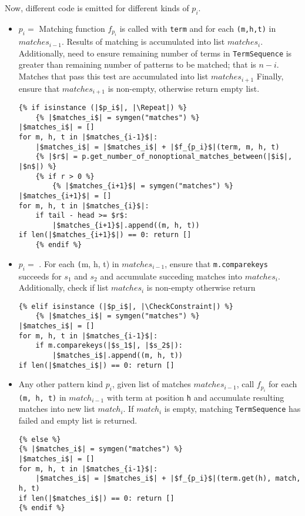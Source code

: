 Now, different code is emitted for different kinds of $p_i$. 

\begin{itemize}
\item $p_i=$ \Repeat Matching function $f_{p_i}$ is called with \texttt{term} and for each \texttt{(m,h,t)} in $matches_{i-1}$. Results of matching is accumulated into list $matches_{i}$. Additionally, need to ensure remaining number of terms in \texttt{TermSequence} is greater than remaining number of patterns to be matched; that is $n-i$. Matches that pass this test are accumulated into list $matches_{i+1}$ Finally, ensure that $matches_{i+1}$ is non-empty, otherwise return empty list.
\begin{verbatim}
{% if isinstance (|$p_i$|, |\Repeat|) %}
	{% |$matches_i$| = symgen("matches") %}
|$matches_i$| = []
for m, h, t in |$matches_{i-1}$|:
	|$matches_i$| = |$matches_i$| + |$f_{p_i}$|(term, m, h, t)
	{% |$r$| = p.get_number_of_nonoptional_matches_between(|$i$|, |$n$|) %}
	{% if r > 0 %}
		{% |$matches_{i+1}$| = symgen("matches") %}
|$matches_{i+1}$| = []
for m, h, t in |$matches_{i}$|:
	if tail - head >= $r$:
		|$matches_{i+1}$|.append((m, h, t))
if len(|$matches_{i+1}$|) == 0: return []
	{% endif %}
\end{verbatim}

\item $p_i=$ \CheckConstraint. For each \texttt(m, h, t) in $matches_{i-1}$, ensure that \texttt{m.comparekeys} succeeds for $s_1$ and $s_2$ and accumulate succeding matches into $matches_{i}$. Additionally, check if list $matches_{i}$ is non-empty otherwise return
\begin{verbatim}
{% elif isinstance (|$p_i$|, |\CheckConstraint|) %}
	{% |$matches_i$| = symgen("matches") %}
|$matches_i$| = []
for m, h, t in |$matches_{i-1}$|:
	if m.comparekeys(|$s_1$|, |$s_2$|):
		|$matches_i$|.append((m, h, t))
if len(|$matches_i$|) == 0: return []
\end{verbatim}

\item Any other pattern kind $p_i$, given list of matches $matches_{i-1}$, call $f_{p_i}$ for each \texttt{(m, h, t)} in $match_{i-1}$ with term at position \texttt{h} and accumulate resulting matches into new list $match_{i}$. If $match_{i}$ is empty, matching \texttt{TermSequence} has failed and empty list is returned.
\begin{verbatim}
{% else %}
{% |$matches_i$| = symgen("matches") %}
|$matches_i$| = []
for m, h, t in |$matches_{i-1}$|:
	|$matches_i$| = |$matches_i$| + |$f_{p_i}$|(term.get(h), match, h, t)
if len(|$matches_i$|) == 0: return []
{% endif %}
\end{verbatim}
\end{itemize}





